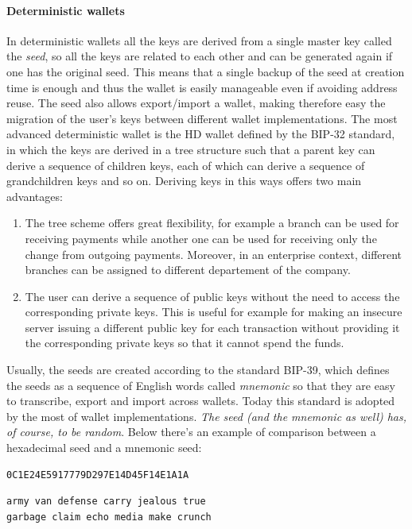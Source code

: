 \paragraph{Deterministic wallets} In deterministic wallets all the keys are
derived from a single master key called the \emph{seed}, so all the keys are
related to each other and can be generated again if one has the original seed.
This means that a single backup of the seed at creation time is enough and thus
the wallet is easily manageable even if avoiding address reuse. The seed also
allows export/import a wallet, making therefore easy the migration of the user's
keys between different wallet implementations. The most advanced deterministic
wallet is the HD wallet defined by the BIP-32 standard, in which the keys are
derived in a tree structure such that a parent key can derive a sequence of
children keys, each of which can derive a sequence of grandchildren keys and so
on. Deriving keys in this ways offers two main advantages:
\begin{enumerate}
  \item The tree scheme offers great flexibility, for example a branch can be used
  for receiving payments while another one can be used for receiving only
  the change from outgoing payments. Moreover, in an enterprise context, different
  branches can be assigned to different departement of the company.
  \item The user can derive a sequence of public keys without the need to access
  the corresponding private keys. This is useful for example for making an insecure
  server issuing a different public key for each transaction without providing
  it the corresponding private keys so that it cannot spend the funds.
\end{enumerate}
Usually, the seeds are created according to the standard BIP-39, which defines
the seeds as a sequence of English words called \emph{mnemonic} so that they are
easy to transcribe, export and import across wallets. Today this standard is adopted
by the most of wallet implementations. \emph{The seed (and the mnemonic as well) has,
of course, to be random}. Below there's an example of comparison between a
hexadecimal seed and a mnemonic seed:
\begin{lstlisting}[title=Hex seed for a deterministic wallet:]
0C1E24E5917779D297E14D45F14E1A1A
\end{lstlisting}
\begin{lstlisting}[title=12-word mnemonic seed for a deterministic wallet:]
army van defense carry jealous true
garbage claim echo media make crunch
\end{lstlisting}

